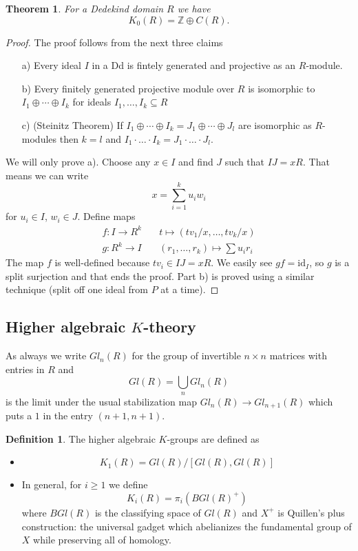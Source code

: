 \documentclass[a4paper,10pt]{article}
\theoremstyle{plain}%
\newtheorem{thm}{Theorem}
\theoremstyle{definition}
\newtheorem{defn}{Definition}
\theoremstyle{remark}
\newcommand{\ZZ}{\mathbb{Z}}
\begin{document}
\begin{thm}
For a Dedekind domain $R$ we have
$$K_0(R)=\ZZ\oplus C(R).$$
\end{thm}
\begin{proof}
The proof follows from the next three claims
\begin{itemize}
\item[a)] Every ideal $I$ in a Dd is fintely generated and projective as an $R$-module.
\item[b)] Every finitely generated projective module over $R$ is isomorphic to $I_1\oplus\cdots\oplus I_k$ for ideals $I_1,\ldots,I_k\subseteq R$
\item[c)] (Steinitz Theorem) If $I_1\oplus\cdots\oplus I_k=J_1\oplus\cdots\oplus J_l$ are isomorphic as $R$-modules then $k=l$ and $I_1\cdot\ldots\cdot I_k=J_1\cdot\ldots\cdot J_l$.
\end{itemize}
We will only prove a). Choose any $x\in I$ and find $J$ such that $IJ=xR$. That means we can write 
$$x=\sum_{i=1}^k u_iw_i$$
for $u_i\in I$, $w_i\in J$.
Define maps
\begin{align*}
f:I\to R^k &\quad t\mapsto (tv_1/x,\ldots,tv_k/x)\\
g:R^k\to I &\quad (r_1,\ldots,r_k)\mapsto \sum u_ir_i
\end{align*}
The map $f$ is well-defined because $tv_i\in IJ=xR$. We easily see $gf=\textrm{id}_I$, so $g$ is a split surjection and that ends the proof.
Part b) is proved using a similar technique (split off one ideal from $P$ at a time).
\end{proof}

\subsection{Higher algebraic $K$-theory}
As always we write $Gl_n(R)$ for the group of invertible $n\times n$ matrices with entries in $R$ and 
$$Gl(R)=\bigcup_{n} Gl_n(R)$$
is the limit under the usual stabilization map $Gl_n(R)\to Gl_{n+1}(R)$ which puts a $1$ in the entry $(n+1,n+1)$.

\begin{defn}
The higher algebraic $K$-groups are defined as
\begin{itemize}
\item $$K_1(R)=Gl(R)\big/[Gl(R),Gl(R)]$$
\item In general, for $i\geq 1$ we define
$$K_i(R)=\pi_i(BGl(R)^+)$$
where $BGl(R)$ is the classifying space of $Gl(R)$ and $X^+$ is Quillen's plus construction: the universal gadget which abelianizes the fundamental group of $X$ while preserving all of homology.
\end{itemize}
\end{defn}
\end{document}
